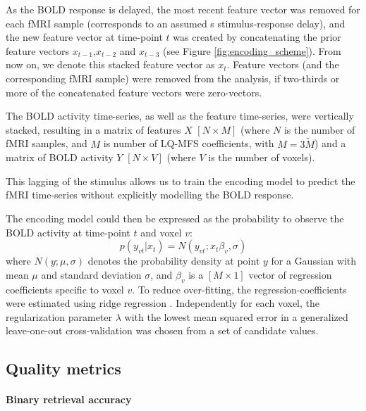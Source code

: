 As the BOLD response is delayed,  the most recent feature vector was removed
for each f{MRI} sample (corresponds to an assumed \unit[2]{s} stimulus-response
delay), and the new feature vector at time-point $t$ was created by
concatenating the prior feature vectors $x_{t-1}$,$x_{t-2}$ and $x_{t-3}$ (see
Figure \ref{fig:encoding_scheme}). From now on, we denote this stacked feature
vector as $x_{t}$.  Feature vectors (and the corresponding f{MRI} sample) were
removed from the analysis, if two-thirds or more of the concatenated feature
vectors were zero-vectors.

The BOLD activity time-series, as well as the feature time-series, were
vertically stacked, resulting in a matrix of features $X$ $[N\times M]$ (where
$N$ is the number of f{MRI} samples, and $M$ is number of LQ-MFS coefficients,
with $M=3\widetilde{M}$) and a matrix of BOLD activity $Y$ $[N\times V]$ (where
$V$ is the number of voxels).

This lagging of the stimulus allows us to train the encoding model to predict
the f{MRI} time-series without explicitly modelling the BOLD response.

The encoding model could then be expressed as the probability to observe the
BOLD activity at time-point $t$ and voxel $v$:
%
\begin{equation}
  \label{eq:encmo}
  p(y_{vt}|x_{t}) = N(y_{vt};x_{t}\beta_{v},\sigma)
\end{equation}
%
where $N(y;\mu,\sigma)$ denotes the probability density at point $y$ for a
Gaussian with mean $\mu$ and standard deviation $\sigma$, and $\beta_{v}$ is a
$[M\times1]$ vector of regression coefficients specific to voxel $v$. To reduce
over-fitting, the regression-coefficients were estimated using ridge regression
\citep{HK70}.  Independently for each voxel, the regularization parameter
$\lambda$ with the lowest mean squared error in a generalized leave-one-out
cross-validation \citep{GHW79} was chosen from a set of candidate values.

\subsection*{Quality metrics} 

\paragraph{Binary retrieval accuracy}

